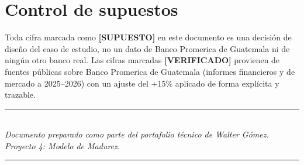\documentclass[11pt,a4paper]{article}
\begin{document}
	\section{Control de supuestos}
	
	Toda cifra marcada como \textbf{[SUPUESTO]} en este documento es una decisión de diseño del caso de estudio, no un dato de Banco Promerica de Guatemala ni de ningún otro banco real. Las cifras marcadas \textbf{[VERIFICADO]} provienen de fuentes públicas sobre Banco Promerica de Guatemala (informes financieros y de mercado a 2025--2026) con un ajuste del +15\% aplicado de forma explícita y trazable.
	
	\vspace{1cm}
	
	\begin{center}
		\textcolor{bancogray}{\rule{0.5\textwidth}{0.4pt}}\\[0.3cm]
		\textit{Documento preparado como parte del portafolio técnico de Walter Gómez.\\
			Proyecto 4: Modelo de Madurez.}\\[0.3cm]
		\textcolor{bancogray}{\rule{0.5\textwidth}{0.4pt}}
	\end{center}
	
\end{document}
